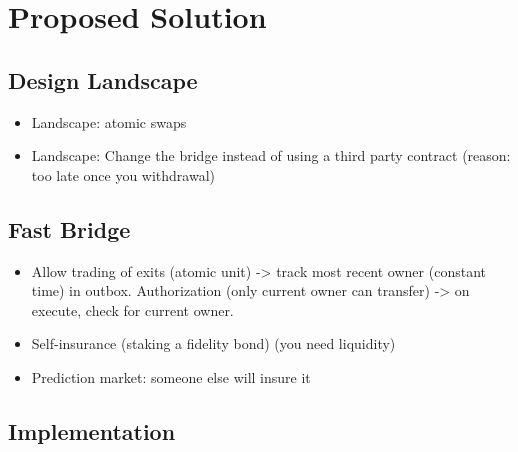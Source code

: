 \section{Proposed Solution} 

\subsection{Design Landscape}

\begin{itemize}
\item Landscape: atomic swaps
\item Landscape: Change the bridge instead of using a third party contract (reason: too late once you withdrawal)
\end{itemize}

\subsection{Fast Bridge} 

\begin{itemize}
\item Allow trading of exits (atomic unit) -> track most recent owner (constant time) in outbox. Authorization (only current owner can transfer) -> on execute, check for current owner. 
\item Self-insurance (staking a fidelity bond) (you need liquidity) 
\item Prediction market: someone else will insure it
\end{itemize}

\subsection{Implementation} 

